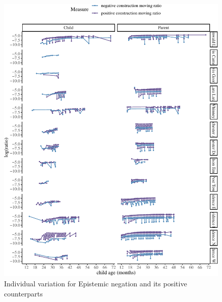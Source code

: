 \documentclass[
  english,
  man,floatsintext]{apa6}
\begin{document}
\begin{figure}[H]

{\centering \includegraphics{neg_construction_article_files/figure-latex/individualepistemic-1} 

}

\caption{Individual variation for Epistemic negation and its positive counterparts}\label{fig:individualepistemic}
\end{figure}
\end{document}
